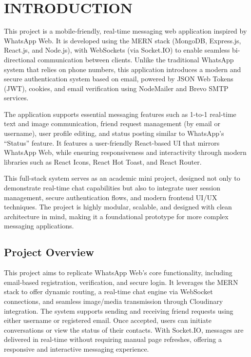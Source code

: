 \documentclass[12pt,a4paper]{report}
\begin{document}
\newpage
{}
\chapter{INTRODUCTION}

This project is a mobile-friendly, real-time messaging web application inspired by WhatsApp Web. It is developed using the MERN stack (MongoDB, Express.js, React.js, and Node.js), with WebSockets (via Socket.IO) to enable seamless bi-directional communication between clients. Unlike the traditional WhatsApp system that relies on phone numbers, this application introduces a modern and secure authentication system based on email, powered by JSON Web Tokens (JWT), cookies, and email verification using NodeMailer and Brevo SMTP services.

The application supports essential messaging features such as 1-to-1 real-time text and image communication, friend request management (by email or username), user profile editing, and status posting similar to WhatsApp’s “Status” feature. It features a user-friendly React-based UI that mirrors WhatsApp Web, while ensuring responsiveness and interactivity through modern libraries such as React Icons, React Hot Toast, and React Router.

This full-stack system serves as an academic mini project, designed not only to demonstrate real-time chat capabilities but also to integrate user session management, secure authentication flows, and modern frontend UI/UX techniques. The project is highly modular, scalable, and designed with clean architecture in mind, making it a foundational prototype for more complex messaging applications.

\section{Project Overview}
This project aims to replicate WhatsApp Web’s core functionality, including email-based registration, verification, and secure login. It leverages the MERN stack to offer dynamic routing, a real-time chat engine via WebSocket connections, and seamless image/media transmission through Cloudinary integration. The system supports sending and receiving friend requests using either username or registered email. Once accepted, users can initiate conversations or view the status of their contacts. With Socket.IO, messages are delivered in real-time without requiring manual page refreshes, offering a responsive and interactive messaging experience.
\end{document}
